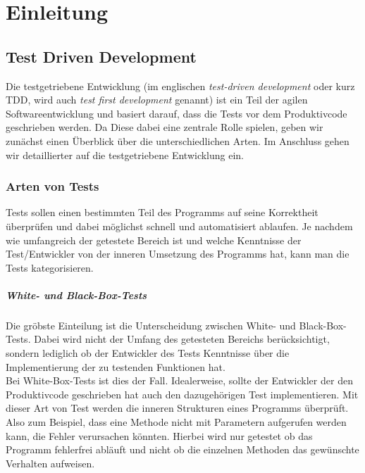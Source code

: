 \chapter{Einleitung}



\section{Test Driven Development}

Die testgetriebene Entwicklung (im englischen \textit{test-driven development} oder kurz TDD, wird auch \textit{test first development} genannt) ist ein Teil der agilen Softwareentwicklung und basiert darauf, dass die Tests vor dem Produktivcode geschrieben werden. Da Diese dabei eine zentrale Rolle spielen, geben wir zunächst einen Überblick über die unterschiedlichen Arten. Im Anschluss gehen wir detaillierter auf die testgetriebene Entwicklung ein.

\subsection{Arten von Tests}

Tests sollen einen bestimmten Teil des Programms auf seine Korrektheit überprüfen und dabei möglichst schnell und automatisiert ablaufen. Je nachdem wie umfangreich der getestete Bereich ist und welche Kenntnisse der Test/Entwickler von der inneren Umsetzung des Programms hat, kann man die Tests kategorisieren.

\paragraph{White- und Black-Box-Tests} Die gröbste Einteilung ist die Unterscheidung zwischen White- und Black-Box-Tests. Dabei wird nicht der Umfang des getesteten Bereichs berücksichtigt, sondern lediglich ob der Entwickler des Tests Kenntnisse über die Implementierung der zu testenden Funktionen hat.\\
Bei White-Box-Tests ist dies der Fall. Idealerweise, sollte der Entwickler der den Produktivcode geschrieben hat auch den dazugehörigen Test implementieren. Mit dieser Art von Test werden die inneren Strukturen eines Programms überprüft. Also zum Beispiel, dass eine Methode nicht mit Parametern aufgerufen werden kann, die Fehler verursachen könnten. Hierbei wird nur getestet ob das Programm fehlerfrei abläuft und nicht ob die einzelnen Methoden das gewünschte Verhalten aufweisen.

